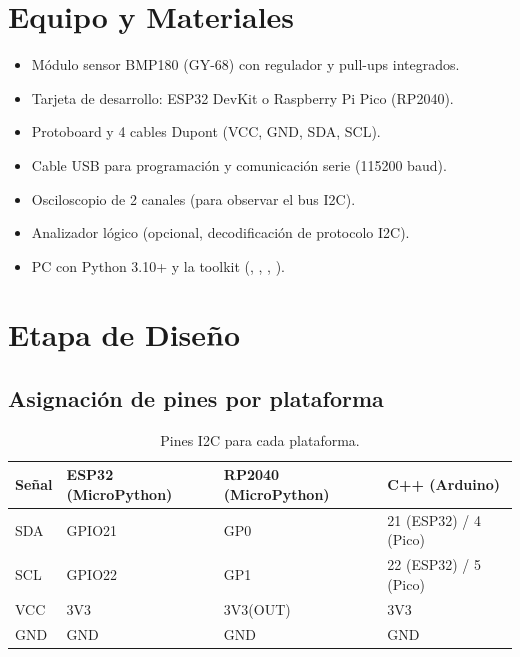 \documentclass[11pt]{article}
\begin{document}
\section{Equipo y Materiales}
\begin{itemize}
  \item Módulo sensor BMP180 (GY-68) con regulador y pull-ups integrados.
  \item Tarjeta de desarrollo: ESP32 DevKit o Raspberry Pi Pico (RP2040).
  \item Protoboard y 4 cables Dupont (VCC, GND, SDA, SCL).
  \item Cable USB para programación y comunicación serie (115200 baud).
  \item Osciloscopio de 2 canales (para observar el bus I2C).
  \item Analizador lógico (opcional, decodificación de protocolo I2C).
  \item PC con Python 3.10+ y la toolkit 
        (, , , ).
\end{itemize}

\section{Etapa de Diseño}

\subsection{Asignación de pines por plataforma}
\begin{table}[H]\centering
\caption{Pines I2C para cada plataforma.}
\begin{tabular}{llll}
\toprule
Señal & ESP32 (MicroPython) & RP2040 (MicroPython) & C++ (Arduino) \\
\midrule
SDA & GPIO21 & GP0 & 21 (ESP32) / 4 (Pico) \\
SCL & GPIO22 & GP1 & 22 (ESP32) / 5 (Pico) \\
VCC & 3V3 & 3V3(OUT) & 3V3 \\
GND & GND & GND & GND \\
\bottomrule
\end{tabular}
\end{table}
\end{document}
